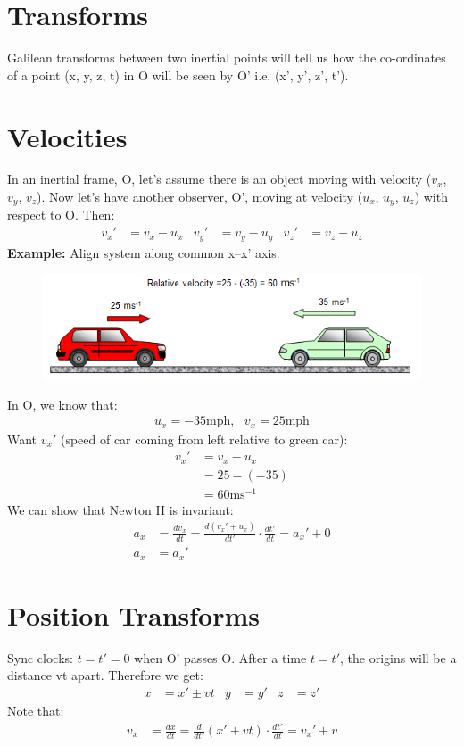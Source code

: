 \documentclass[a4paper, 11pt, normalem]{report}
\begin{document}
\section{Transforms}
Galilean transforms between two inertial points will tell us how the co-ordinates of a point (x, y, z, t) in O will be seen by O' i.e. (x', y', z', t').

\section{Velocities}
In an inertial frame, O, let's assume there is an object moving with velocity ($v_{x}$, $v_{y}$, $v_{z}$).
Now let's have another observer, O', moving at velocity ($u_{x}$, $u_{y}$, $u_{z}$) with respect to O.
Then:
\begin{align}
    v_{x}' &= v_{x} - u_{x} & v_{y}' &= v_{y} - u_{y} & v_{z}' &= v_{z} - u_{z}
\end{align}
\textbf{Example:} Align system along common x--x' axis.
\begin{figure}[H]
    \centering
    \includegraphics{Cars.png}
\end{figure}
In O, we know that:
\begin{align}
    u_{x} = -35\text{mph},~~~v_{x} = 25\text{mph}
\end{align}
Want $v_{x}'$ (speed of car coming from left relative to green car):
\begin{align}
    v_{x}' &= v_{x} - u_{x} \\
           &= 25 - (-35) \\
           &= 60\text{ms}^{-1}
\end{align}
We can show that Newton II is invariant:
\begin{align}
    a_{x} &= \frac{dv_{x}}{dt} = \frac{d(v_{x}' + u_{x})}{dt'}\cdot \frac{dt'}{dt} = a_{x}' + 0 \\
    a_{x} &= a_{x}'
\end{align}

\section{Position Transforms}
Sync clocks: $t = t' = 0$ when O' passes O.
After a time $t = t'$,  the origins will be a distance vt apart.
Therefore we get:
\begin{align}
    x &= x' \pm vt & y &= y' & z &= z'
\end{align}
Note that:
\begin{align}
    v_{x} &= \frac{dx}{dt} = \frac{d}{dt'}(x' + vt)\cdot\frac{dt'}{dt} = v_{x}' + v
\end{align}
\end{document}

